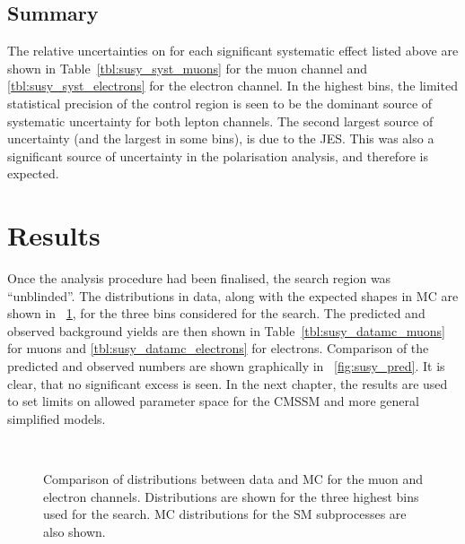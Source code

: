 \subsection{Summary}
The relative uncertainties on \RCS for each significant systematic effect listed
above are shown in Table~\ref{tbl:susy_syst_muons} for the muon channel and
\ref{tbl:susy_syst_electrons} for the electron channel. In the highest \STlep
bins, the limited statistical precision of the control region is seen to be the
dominant source of systematic uncertainty for both lepton channels. The second
largest source of uncertainty (and the largest in some bins), is due to the
\ac{JES}. This was also a significant source of uncertainty in the \PW
polarisation analysis, and therefore is expected.




\section{Results}
Once the analysis procedure had been finalised, the search region was
``unblinded''. The \LP distributions in data, along with the expected shapes in
\ac{MC} are shown in \fig~\ref{fig:susy_datamc}, for the three \STlep bins
considered for the search. The predicted and observed background yields are then
shown in Table~\ref{tbl:susy_datamc_muons} for muons and
\ref{tbl:susy_datamc_electrons} for electrons. Comparison of the predicted and
observed numbers are shown graphically in \fig~\ref{fig:susy_pred}. It is clear,
that no significant excess is seen. In the next chapter, the results are used to
set limits on allowed parameter space for the \ac{CMSSM} and more general
simplified models.

\begin{figure}
  \centering {}\quad
  \quad
  \\
  \quad
  \quad
  \caption[Comparison of \LP distributions between data and \ac{MC}]{Comparison
    of \LP distributions between data and \ac{MC} for the muon and electron
    channels. Distributions are shown for the three highest \STlep bins used for
    the search. \ac{MC} distributions for the \ac{SM} subprocesses are also
    shown.}
\label{fig:susy_datamc}
\end{figure}

